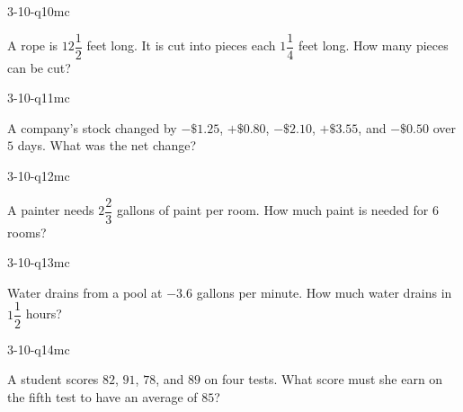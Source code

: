 \begin{practiceQuestion}{3-10-q10}{mc}
\begin{questionText}
A rope is $12\dfrac{1}{2}$ feet long. It is cut into pieces each $1\dfrac{1}{4}$ feet long. How many pieces can be cut?
\end{questionText}
\end{practiceQuestion}

\begin{practiceQuestion}{3-10-q11}{mc}
\begin{questionText}
A company's stock changed by $-\$1.25$, $+\$0.80$, $-\$2.10$, $+\$3.55$, and $-\$0.50$ over $5$ days. What was the net change?
\end{questionText}
\end{practiceQuestion}

\begin{practiceQuestion}{3-10-q12}{mc}
\begin{questionText}
A painter needs $2\dfrac{2}{3}$ gallons of paint per room. How much paint is needed for $6$ rooms?
\end{questionText}
\end{practiceQuestion}

\begin{practiceQuestion}{3-10-q13}{mc}
\begin{questionText}
Water drains from a pool at $-3.6$ gallons per minute. How much water drains in $1\dfrac{1}{2}$ hours?
\end{questionText}
\end{practiceQuestion}

\begin{practiceQuestion}{3-10-q14}{mc}
\begin{questionText}
A student scores $82$, $91$, $78$, and $89$ on four tests. What score must she earn on the fifth test to have an average of $85$?
\end{questionText}
\end{practiceQuestion}

